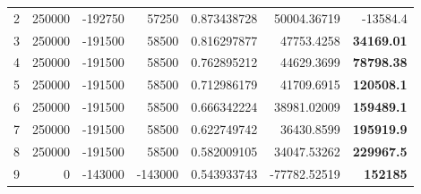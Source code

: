 \documentclass[12pt]{article}
\begin{document}
\begin{landscape}
\begin{table}[htbp]
\begin{tabular}{rrrrrrr}
    2     & 250000 & -192750 & 57250 & 0.873438728 & 50004.36719 & -13584.4 \\
    3     & 250000 & -191500 & 58500 & 0.816297877 & 47753.4258 & \textbf{34169.01} \\
    4     & 250000 & -191500 & 58500 & 0.762895212 & 44629.3699 & \textbf{78798.38} \\
    5     & 250000 & -191500 & 58500 & 0.712986179 & 41709.6915 & \textbf{120508.1} \\
    6     & 250000 & -191500 & 58500 & 0.666342224 & 38981.02009 & \textbf{159489.1} \\
    7     & 250000 & -191500 & 58500 & 0.622749742 & 36430.8599 & \textbf{195919.9} \\
    8     & 250000 & -191500 & 58500 & 0.582009105 & 34047.53262 & \textbf{229967.5} \\
    \midrule
    9     & 0     & -143000 & -143000 & 0.543933743 & -77782.52519 & \textbf{152185} \\
  
    \bottomrule
    \end{tabular}%
  \label{profit1}%
\end{table}%

\end{landscape}
\end{document}
